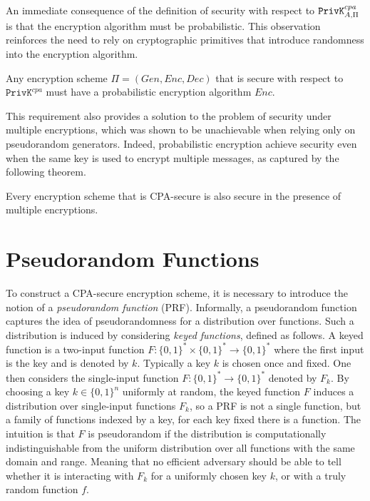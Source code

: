 An immediate consequence of the definition of security with respect to $\mathtt{PrivK}^{cpa}_{A,\Pi}$ is that the encryption algorithm must be probabilistic. This observation reinforces the need to rely on cryptographic primitives that introduce randomness into the encryption algorithm.

\begin{lemma}
Any encryption scheme $\Pi = (Gen, Enc, Dec)$ that is secure with respect to $\mathtt{PrivK}^{cpa}$ must have a probabilistic encryption algorithm $Enc$.
\end{lemma}
This requirement also provides a solution to the problem of security under multiple encryptions, which was shown to be unachievable when relying only on pseudorandom generators. Indeed, probabilistic encryption achieve security even when the same key is used to encrypt multiple messages, as captured by the following theorem.
\begin{theorem}
Every encryption scheme that is CPA-secure is also secure in the presence of multiple encryptions.
\end{theorem}

\section{Pseudorandom Functions}
To construct a CPA-secure encryption scheme, it is necessary to introduce the notion of a \emph{pseudorandom function} (PRF). Informally, a pseudorandom function captures the idea of pseudorandomness for a distribution over functions. Such a distribution is induced by considering \emph{keyed functions}, defined as follows. A keyed function is a two-input function $F: \{0, 1\}^* \times \{0, 1\}^* \to \{0, 1\}^*$ where the first input is the key and is denoted by $k$. Typically a key $k$ is chosen once and fixed. One then considers the single-input function $F:\{0,1\}^* \to \{0,1\}^*$ denoted by $F_k$. By choosing a key $k \in \{0,1\}^n$ uniformly at random, the keyed function $F$ induces a distribution over single-input functions $F_k$, so a PRF is not a single function, but a family of functions indexed by a key, for each key fixed there is a function. The intuition is that $F$ is pseudorandom if the distribution is computationally indistinguishable from the uniform distribution over all functions with the same domain and range. Meaning that no efficient adversary should be able to tell whether it is interacting with $F_k$ for a uniformly chosen key $k$, or with a truly random function $f$. 

